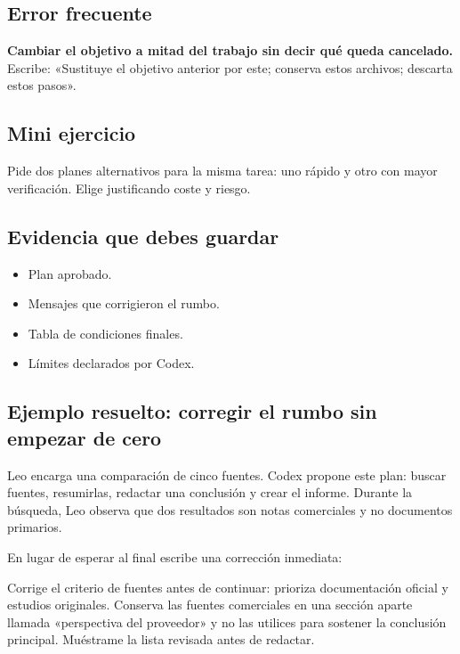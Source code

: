 \documentclass[10pt,a4paper,openany]{book}
\providecommand{\tightlist}{\setlength{\itemsep}{0.18em}\setlength{\parskip}{0pt}}
\newenvironment{Shaded}{}{}
\newcommand{\NormalTok}[1]{#1}
\renewenvironment{Shaded}
  {\begin{tcolorbox}[
    enhanced,
    breakable,
    colback=CodeBg,
    colframe=Border,
    boxrule=0.5pt,
    arc=2mm,
    left=3mm,
    right=3mm,
    top=2.2mm,
    bottom=2.2mm,
    before skip=0.8em,
    after skip=0.9em
  ]}
  {\end{tcolorbox}}
\begin{document}
\subsection{Error frecuente}\label{error-frecuente-5}

\textbf{Cambiar el objetivo a mitad del trabajo sin decir qué queda
cancelado.} Escribe: «Sustituye el objetivo anterior por este; conserva
estos archivos; descarta estos pasos».

\subsection{Mini ejercicio}\label{mini-ejercicio-2}

Pide dos planes alternativos para la misma tarea: uno rápido y otro con
mayor verificación. Elige justificando coste y riesgo.

\subsection{Evidencia que debes
guardar}\label{evidencia-que-debes-guardar-5}

\begin{itemize}
\tightlist
\item
  Plan aprobado.
\item
  Mensajes que corrigieron el rumbo.
\item
  Tabla de condiciones finales.
\item
  Límites declarados por Codex.
\end{itemize}

\subsection{Ejemplo resuelto: corregir el rumbo sin empezar de
cero}\label{ejemplo-resuelto-corregir-el-rumbo-sin-empezar-de-cero}

Leo encarga una comparación de cinco fuentes. Codex propone este plan:
buscar fuentes, resumirlas, redactar una conclusión y crear el informe.
Durante la búsqueda, Leo observa que dos resultados son notas
comerciales y no documentos primarios.

En lugar de esperar al final escribe una corrección inmediata:

\begin{Shaded}
\begin{Highlighting}[]
\NormalTok{Corrige el criterio de fuentes antes de continuar: prioriza documentación}
\NormalTok{oficial y estudios originales. Conserva las fuentes comerciales en una}
\NormalTok{sección aparte llamada «perspectiva del proveedor» y no las utilices para}
\NormalTok{sostener la conclusión principal. Muéstrame la lista revisada antes de redactar.}
\end{Highlighting}
\end{Shaded}
\end{document}
